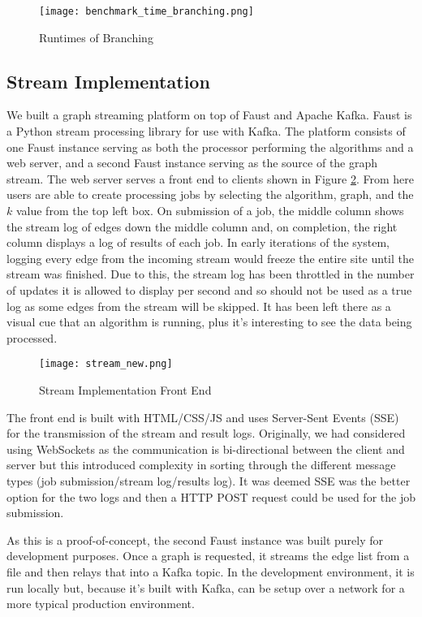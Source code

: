 \begin{figure}[H]
    \centering
    \texttt{[image: benchmark\_time\_branching.png]}
    \caption{Runtimes of Branching}
    \label{fig:benchmark_time_branching}
\end{figure}

\subsection{Stream Implementation}

We built a graph streaming platform on top of Faust and Apache Kafka.
Faust is a Python stream processing library for use with Kafka. The
platform consists of one Faust instance serving as both the processor
performing the algorithms and a web server, and a second Faust instance
serving as the source of the graph stream. The web server serves a front
end to clients shown in Figure \ref{fig:stream_font_end}. From here users are able to create
processing jobs by selecting the algorithm, graph, and the \(k\) value
from the top left box. On submission of a job, the middle column shows
the stream log of edges down the middle column and, on completion, the
right column displays a log of results of each job. In early iterations
of the system, logging every edge from the incoming stream would freeze
the entire site until the stream was finished. Due to this, the stream
log has been throttled in the number of updates it is allowed to display
per second and so should not be used as a true log as some edges from
the stream will be skipped. It has been left there as a visual cue that
an algorithm is running, plus it's interesting to see the data being
processed.

\begin{figure}[htb]
    \centering
    \texttt{[image: stream\_new.png]}
    \caption{Stream Implementation Front End}
    \label{fig:stream_font_end}
\end{figure}

The front end is built with HTML/CSS/JS and uses Server-Sent Events
(SSE) for the transmission of the stream and result logs. Originally, we
had considered using WebSockets as the communication is bi-directional
between the client and server but this introduced complexity in sorting
through the different message types (job submission/stream log/results
log). It was deemed SSE was the better option for the two logs and then
a HTTP POST request could be used for the job submission.

As this is a proof-of-concept, the second Faust instance was built
purely for development purposes. Once a graph is requested, it streams
the edge list from a file and then relays that into a Kafka topic. In
the development environment, it is run locally but, because it's built
with Kafka, can be setup over a network for a more typical production
environment.

